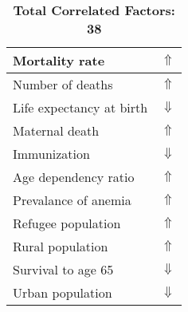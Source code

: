 \documentclass[12pt,notitlepage,oneside]{report}
\begin{document}
\begin{table}[!htb]
\begin{tabular}{|l|l|}
Mortality rate & $\Uparrow$\\ \hline
Number of deaths & $\Uparrow$\\ \hline
Life expectancy at birth & $\Downarrow$\\ \hline
Maternal death & $\Uparrow$\\ \hline
Immunization & $\Downarrow$\\ \hline
Age dependency ratio & $\Uparrow$\\ \hline
Prevalance of anemia & $\Uparrow$\\ \hline
Refugee population & $\Uparrow$\\ \hline
Rural population & $\Uparrow$\\ \hline
Survival to age 65 & $\Downarrow$\\ \hline
Urban population & $\Downarrow$\\ \hline
\end{tabular}
\caption*{\textbf{Total Correlated Factors: 38}}
\end{table}
\clearpage
\end{document}
